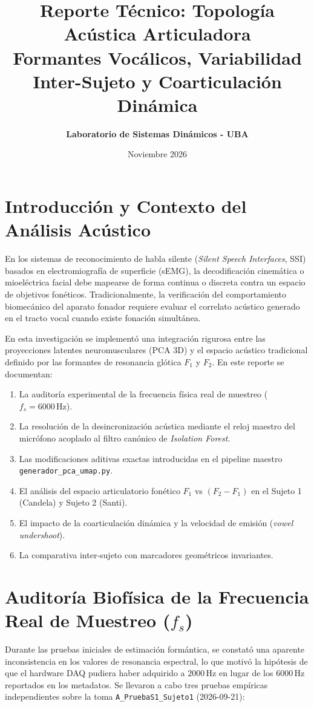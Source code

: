 \documentclass[11pt,a4paper]{article}
\title{\textbf{Reporte Técnico: Topología Acústica Articuladora\\Formantes Vocálicos, Variabilidad Inter-Sujeto y Coarticulación Dinámica}}
\author{\textbf{Laboratorio de Sistemas Dinámicos - UBA}}
\date{Noviembre 2026}
\begin{document}
\maketitle

\section{Introducción y Contexto del Análisis Acústico}

En los sistemas de reconocimiento de habla silente (\textit{Silent Speech Interfaces}, SSI) basados en electromiografía de superficie (sEMG), la decodificación cinemática o mioeléctrica facial debe mapearse de forma continua o discreta contra un espacio de objetivos fonéticos. Tradicionalmente, la verificación del comportamiento biomecánico del aparato fonador requiere evaluar el correlato acústico generado en el tracto vocal cuando existe fonación simultánea.

En esta investigación se implementó una integración rigurosa entre las proyecciones latentes neuromusculares (PCA 3D) y el espacio acústico tradicional definido por las formantes de resonancia glótica $F_1$ y $F_2$. En este reporte se documentan:
\begin{enumerate}
    \item La auditoría experimental de la frecuencia física real de muestreo ($f_s = 6000\,\text{Hz}$).
    \item La resolución de la desincronización acústica mediante el reloj maestro del micrófono acoplado al filtro canónico de \textit{Isolation Forest}.
    \item Las modificaciones aditivas exactas introducidas en el pipeline maestro \texttt{generador\_pca\_umap.py}.
    \item El análisis del espacio articulatorio fonético $F_1$ vs $(F_2 - F_1)$ en el Sujeto 1 (Candela) y Sujeto 2 (Santi).
    \item El impacto de la coarticulación dinámica y la velocidad de emisión (\textit{vowel undershoot}).
    \item La comparativa inter-sujeto con marcadores geométricos invariantes.
\end{enumerate}

\section{Auditoría Biofísica de la Frecuencia Real de Muestreo ($f_s$)}

Durante las pruebas iniciales de estimación formántica, se constató una aparente inconsistencia en los valores de resonancia espectral, lo que motivó la hipótesis de que el hardware DAQ pudiera haber adquirido a $2000\,\text{Hz}$ en lugar de los $6000\,\text{Hz}$ reportados en los metadatos. Se llevaron a cabo tres pruebas empíricas independientes sobre la toma \texttt{A\_PruebaS1\_Sujeto1} (2026-09-21):
\end{document}
